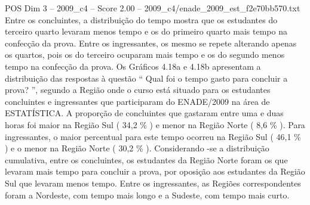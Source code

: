 \begin{textsample}{POS Dim 3 – 2009\_c4 – Score 2.00 – 2009\_c4/enade\_2009\_est\_f2e70bb570.txt}
Entre os concluintes, a distribuição do tempo mostra que os estudantes do terceiro quarto levaram menos tempo e os do primeiro quarto mais tempo na confecção da prova.
Entre os ingressantes, os mesmo se repete alterando apenas os quartos, pois os do terceiro ocuparam mais tempo e os do segundo menos tempo na confecção da prova.
Os Gráficos 4.18a e 4.18b apresentam a distribuição das respostas à questão “ Qual foi o tempo gasto para concluir a prova? ”, segundo a Região onde o curso está situado para os estudantes concluintes e ingressantes que participaram do ENADE/2009 na área de ESTATÍSTICA.
A proporção de concluintes que gastaram entre uma e duas horas foi maior na Região Sul ( 34,2 \% ) e menor na Região Norte ( 8,6 \% ).
Para ingressantes, o maior percentual para este tempo ocorreu na Região Sul ( 46,1 \% ) e o menor na Região Norte ( 30,2 \% ).
Considerando -se a distribuição cumulativa, entre os concluintes, os estudantes da Região Norte foram os que levaram mais tempo para concluir a prova, por oposição aos estudantes da Região Sul que levaram menos tempo.
Entre os ingressantes, as Regiões correspondentes foram a Nordeste, com tempo mais longo e a Sudeste, com tempo mais curto.

\end{textsample}
